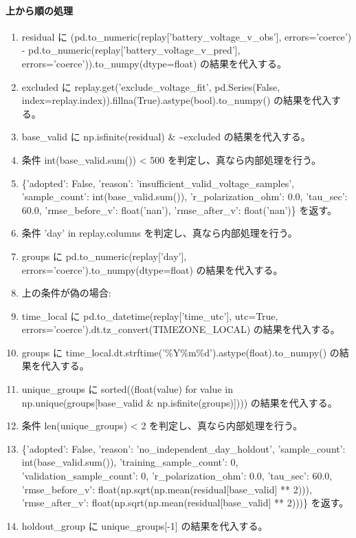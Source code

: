\documentclass[a4paper,11pt]{article}
\begin{document}
            \paragraph{上から順の処理}
            \begin{enumerate}[leftmargin=1.8em]
            \item residual に (pd.to\_numeric(replay['battery\_voltage\_v\_obs'], errors='coerce') - pd.to\_numeric(replay['battery\_voltage\_v\_pred'], errors='coerce')).to\_numpy(dtype=float) の結果を代入する。
\item excluded に replay.get('exclude\_voltage\_fit', pd.Series(False, index=replay.index)).fillna(True).astype(bool).to\_numpy() の結果を代入する。
\item base\_valid に np.isfinite(residual) \& \textasciitilde{}excluded の結果を代入する。
\item 条件 int(base\_valid.sum()) < 500 を判定し、真なら内部処理を行う。
\item   \{'adopted': False, 'reason': 'insufficient\_valid\_voltage\_samples', 'sample\_count': int(base\_valid.sum()), 'r\_polarization\_ohm': 0.0, 'tau\_sec': 60.0, 'rmse\_before\_v': float('nan'), 'rmse\_after\_v': float('nan')\} を返す。
\item 条件 'day' in replay.columns を判定し、真なら内部処理を行う。
\item   groups に pd.to\_numeric(replay['day'], errors='coerce').to\_numpy(dtype=float) の結果を代入する。
\item   上の条件が偽の場合:
\item   time\_local に pd.to\_datetime(replay['time\_utc'], utc=True, errors='coerce').dt.tz\_convert(TIMEZONE\_LOCAL) の結果を代入する。
\item   groups に time\_local.dt.strftime('\%Y\%m\%d').astype(float).to\_numpy() の結果を代入する。
\item unique\_groups に sorted((float(value) for value in np.unique(groups[base\_valid \& np.isfinite(groups)]))) の結果を代入する。
\item 条件 len(unique\_groups) < 2 を判定し、真なら内部処理を行う。
\item   \{'adopted': False, 'reason': 'no\_independent\_day\_holdout', 'sample\_count': int(base\_valid.sum()), 'training\_sample\_count': 0, 'validation\_sample\_count': 0, 'r\_polarization\_ohm': 0.0, 'tau\_sec': 60.0, 'rmse\_before\_v': float(np.sqrt(np.mean(residual[base\_valid] ** 2))), 'rmse\_after\_v': float(np.sqrt(np.mean(residual[base\_valid] ** 2)))\} を返す。
\item holdout\_group に unique\_groups[-1] の結果を代入する。

\end{enumerate}
\end{document}
